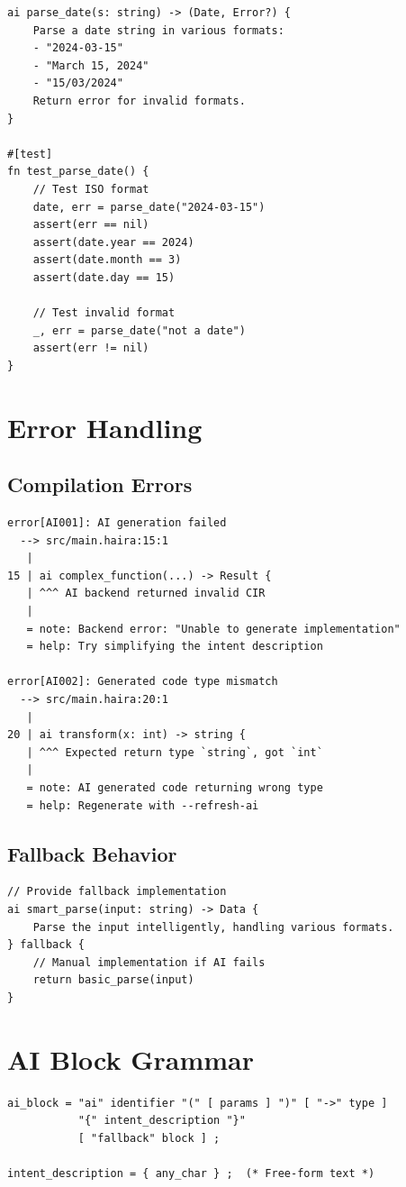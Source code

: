 \begin{lstlisting}
ai parse_date(s: string) -> (Date, Error?) {
    Parse a date string in various formats:
    - "2024-03-15"
    - "March 15, 2024"
    - "15/03/2024"
    Return error for invalid formats.
}

#[test]
fn test_parse_date() {
    // Test ISO format
    date, err = parse_date("2024-03-15")
    assert(err == nil)
    assert(date.year == 2024)
    assert(date.month == 3)
    assert(date.day == 15)

    // Test invalid format
    _, err = parse_date("not a date")
    assert(err != nil)
}
\end{lstlisting}

\section{Error Handling}

\subsection{Compilation Errors}

\begin{lstlisting}[language={}]
error[AI001]: AI generation failed
  --> src/main.haira:15:1
   |
15 | ai complex_function(...) -> Result {
   | ^^^ AI backend returned invalid CIR
   |
   = note: Backend error: "Unable to generate implementation"
   = help: Try simplifying the intent description

error[AI002]: Generated code type mismatch
  --> src/main.haira:20:1
   |
20 | ai transform(x: int) -> string {
   | ^^^ Expected return type `string`, got `int`
   |
   = note: AI generated code returning wrong type
   = help: Regenerate with --refresh-ai
\end{lstlisting}

\subsection{Fallback Behavior}

\begin{lstlisting}
// Provide fallback implementation
ai smart_parse(input: string) -> Data {
    Parse the input intelligently, handling various formats.
} fallback {
    // Manual implementation if AI fails
    return basic_parse(input)
}
\end{lstlisting}

\section{AI Block Grammar}

\begin{lstlisting}[language=EBNF]
ai_block = "ai" identifier "(" [ params ] ")" [ "->" type ]
           "{" intent_description "}"
           [ "fallback" block ] ;

intent_description = { any_char } ;  (* Free-form text *)
\end{lstlisting}
